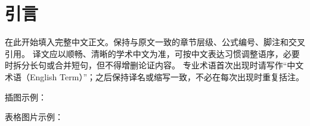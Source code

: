 \section{引言}

在此开始填入完整中文正文。保持与原文一致的章节层级、公式编号、脚注和交叉引用。
译文应以顺畅、清晰的学术中文为准，可按中文表达习惯调整语序，必要时拆分长句或合并短句，但不得增删论证内容。
专业术语首次出现时请写作“中文术语（English Term）”；之后保持译名或缩写一致，不必在每次出现时重复括注。

插图示例：

表格图片示例：
